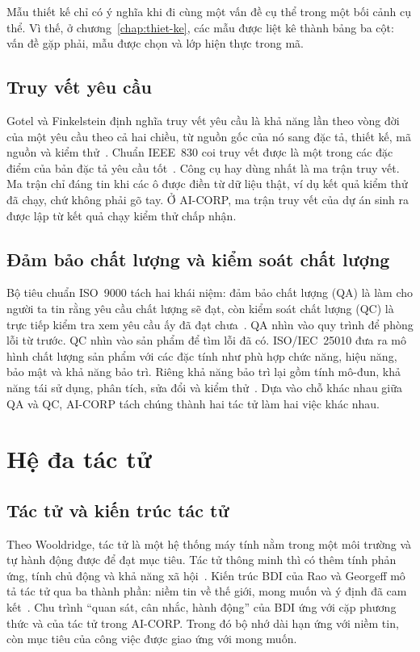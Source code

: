 Mẫu thiết kế chỉ có ý nghĩa khi đi cùng một vấn đề cụ thể trong một bối cảnh cụ thể. Vì thế, ở chương~\ref{chap:thiet-ke}, các mẫu được liệt kê thành bảng ba cột: vấn đề gặp phải, mẫu được chọn và lớp hiện thực trong mã.

\subsection{Truy vết yêu cầu}

Gotel và Finkelstein định nghĩa truy vết yêu cầu là khả năng lần theo vòng đời của một yêu cầu theo cả hai chiều, từ nguồn gốc của nó sang đặc tả, thiết kế, mã nguồn và kiểm thử~\cite{gotel1994}. Chuẩn IEEE~830 coi truy vết được là một trong các đặc điểm của bản đặc tả yêu cầu tốt~\cite{ieee830}. Công cụ hay dùng nhất là ma trận truy vết. Ma trận chỉ đáng tin khi các ô được điền từ dữ liệu thật, ví dụ kết quả kiểm thử đã chạy, chứ không phải gõ tay. Ở AI-CORP, ma trận truy vết của dự án sinh ra được lập từ kết quả chạy kiểm thử chấp nhận.

\subsection{Đảm bảo chất lượng và kiểm soát chất lượng}

Bộ tiêu chuẩn ISO~9000 tách hai khái niệm: đảm bảo chất lượng (QA) là làm cho người ta tin rằng yêu cầu chất lượng sẽ đạt, còn kiểm soát chất lượng (QC) là trực tiếp kiểm tra xem yêu cầu ấy đã đạt chưa~\cite{iso9000}. QA nhìn vào quy trình để phòng lỗi từ trước. QC nhìn vào sản phẩm để tìm lỗi đã có. ISO/IEC~25010 đưa ra mô hình chất lượng sản phẩm với các đặc tính như phù hợp chức năng, hiệu năng, bảo mật và khả năng bảo trì. Riêng khả năng bảo trì lại gồm tính mô-đun, khả năng tái sử dụng, phân tích, sửa đổi và kiểm thử~\cite{iso25010}. Dựa vào chỗ khác nhau giữa QA và QC, AI-CORP tách chúng thành hai tác tử làm hai việc khác nhau.

\section{Hệ đa tác tử}

\subsection{Tác tử và kiến trúc tác tử}

Theo Wooldridge, tác tử là một hệ thống máy tính nằm trong một môi trường và tự hành động được để đạt mục tiêu. Tác tử thông minh thì có thêm tính phản ứng, tính chủ động và khả năng xã hội~\cite{wooldridge2009}. Kiến trúc BDI của Rao và Georgeff mô tả tác tử qua ba thành phần: niềm tin về thế giới, mong muốn và ý định đã cam kết~\cite{rao1995}. Chu trình ``quan sát, cân nhắc, hành động'' của BDI ứng với cặp phương thức  và  của tác tử trong AI-CORP. Trong đó bộ nhớ dài hạn ứng với niềm tin, còn mục tiêu của công việc được giao ứng với mong muốn.


